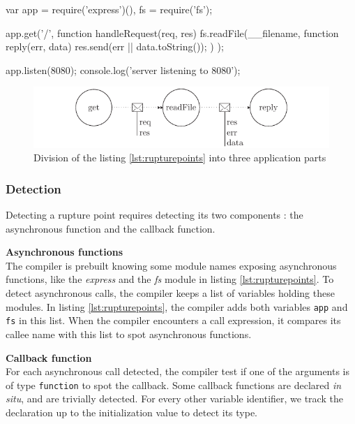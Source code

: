 \begin{code}[js, caption={Example of an application presenting the two types of rupture points. \textnormal{A \texttt{start} with the call to \texttt{app.get()}, and a \texttt{post} with the call to \texttt{fs.readFile()}}},label={lst:rupturepoints}]
var app = require('express')(),
    fs = require('fs');

app.get('/', function handleRequest(req, res) {
  fs.readFile(__filename, function reply(err, data) {
    res.send(err || data.toString());
  })
});

app.listen(8080);
console.log('server listening to 8080');
\end{code}

\begin{figure}[h!]
\begin{center}
  \includegraphics[width=\linewidth]{ressources/flux-2.pdf}
  \caption{Division of the listing \ref{lst:rupturepoints} into three application parts}
  \label{fig:flux-2}
\end{center}
\end{figure}

\subsubsection{Detection}

Detecting a rupture point requires detecting its two components : the asynchronous function and the callback function.

\textbf{Asynchronous functions}\\
The compiler is prebuilt knowing some module names exposing asynchronous functions, like the \textit{express} and the \textit{fs} module in listing \ref{lst:rupturepoints}.
To detect asynchronous calls, the compiler keeps a list of variables holding these modules.
In listing \ref{lst:rupturepoints}, the compiler adds both variables \texttt{app} and \texttt{fs} in this list.
When the compiler encounters a call expression, it compares its callee name with this list to spot asynchronous functions.

\textbf{Callback function}\\
For each asynchronous call detected, the compiler test if one of the arguments is of type \texttt{function} to spot the callback.
Some callback functions are declared \textit{in situ}, and are trivially detected.
For every other variable identifier, we track the declaration up to the initialization value to detect its type.

